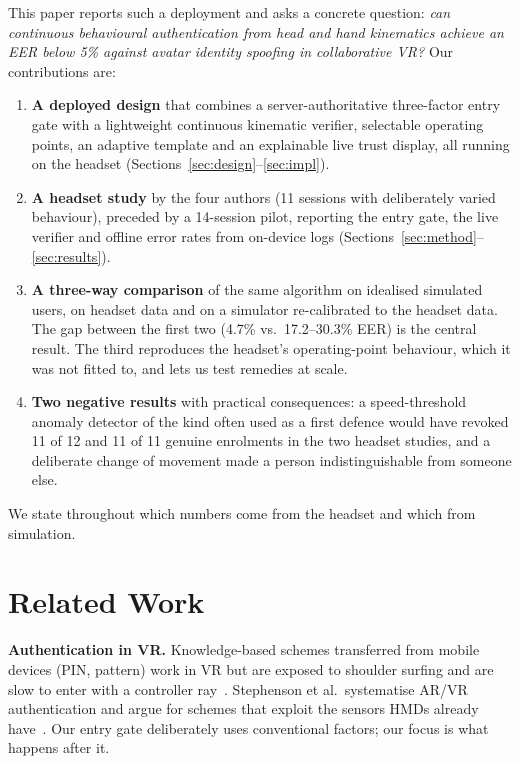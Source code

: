 This paper reports such a deployment and asks a concrete question: \emph{can continuous behavioural authentication from head and hand kinematics achieve an EER below 5\% against avatar identity spoofing in collaborative VR?} Our contributions are:
\begin{enumerate}[leftmargin=*,itemsep=1pt,topsep=2pt]
\item \textbf{A deployed design} that combines a server-authoritative three-factor entry gate with a lightweight continuous kinematic verifier, selectable operating points, an adaptive template and an explainable live trust display, all running on the headset (Sections~\ref{sec:design}--\ref{sec:impl}).
\item \textbf{A headset study} by the four authors (11 sessions with deliberately varied behaviour), preceded by a 14-session pilot, reporting the entry gate, the live verifier and offline error rates from on-device logs (Sections~\ref{sec:method}--\ref{sec:results}).
\item \textbf{A three-way comparison} of the same algorithm on idealised simulated users, on headset data and on a simulator re-calibrated to the headset data. The gap between the first two (4.7\% vs.\ 17.2--30.3\% EER) is the central result. The third reproduces the headset's operating-point behaviour, which it was not fitted to, and lets us test remedies at scale.
\item \textbf{Two negative results} with practical consequences: a speed-threshold anomaly detector of the kind often used as a first defence would have revoked 11 of 12 and 11 of 11 genuine enrolments in the two headset studies, and a deliberate change of movement made a person indistinguishable from someone else.
\end{enumerate}
We state throughout which numbers come from the headset and which from simulation.

\section{Related Work}
\textbf{Authentication in VR.} Knowledge-based schemes transferred from mobile devices (PIN, pattern) work in VR but are exposed to shoulder surfing and are slow to enter with a controller ray~\cite{george2017}. Stephenson et al.\ systematise AR/VR authentication and argue for schemes that exploit the sensors HMDs already have~\cite{stephenson2022}. Our entry gate deliberately uses conventional factors; our focus is what happens after it.


